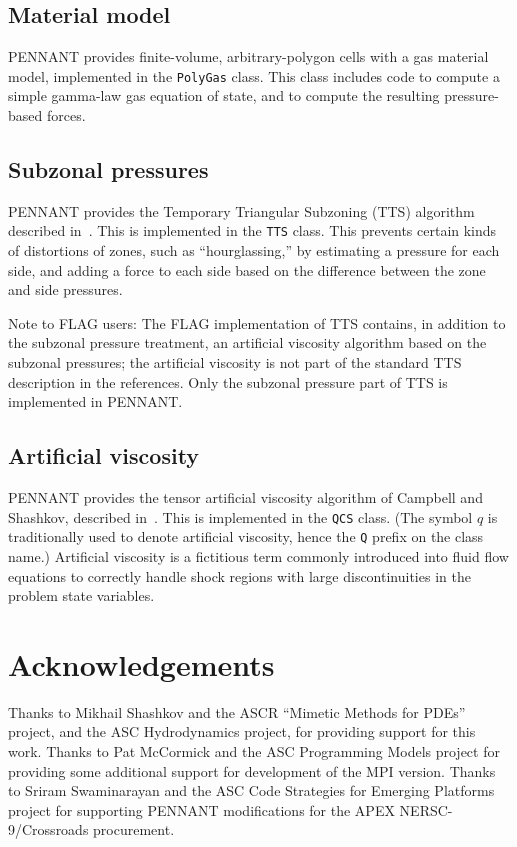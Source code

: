 \documentclass[11pt,letterpaper]{article}
\begin{document}
\subsection{Material model}

PENNANT provides finite-volume, arbitrary-polygon cells with a
gas material model, implemented in the {\tt PolyGas} class.
This class includes code to compute a simple gamma-law gas
equation of state, and to compute the resulting pressure-based
forces.

\subsection{Subzonal pressures}

PENNANT provides the Temporary Triangular Subzoning (TTS) algorithm
described in~\cite{szp,tts}.  This is implemented in the {\tt TTS}
class.  This prevents certain kinds of distortions of zones, such as
``hourglassing,'' by estimating a pressure for each side, and adding
a force to each side based on the difference
between the zone and side pressures.

Note to FLAG users:  The FLAG implementation of TTS contains, in addition
to the subzonal pressure treatment, an artificial viscosity algorithm
based on the subzonal pressures; the artificial viscosity is not part of
the standard TTS description in the references.  Only the subzonal pressure
part of TTS is implemented in PENNANT.

\subsection{Artificial viscosity}

PENNANT provides the tensor artificial viscosity algorithm of Campbell and
Shashkov, described in~\cite{qcs}.  This is implemented in the {\tt QCS}
class.  (The symbol $q$ is traditionally used to denote artificial
viscosity, hence the {\tt Q} prefix on the class name.)
Artificial viscosity is a fictitious term commonly introduced into
fluid flow equations to correctly handle
shock regions with large discontinuities in
the problem state variables.


\section*{Acknowledgements}

Thanks to Mikhail Shashkov and the ASCR ``Mimetic Methods for PDEs''
project, and the ASC Hydrodynamics project, for providing support for
this work.  Thanks to Pat McCormick and the ASC Programming Models
project for providing some additional support for development of the
MPI version.  Thanks to Sriram Swaminarayan and the ASC Code Strategies
for Emerging Platforms project for supporting PENNANT modifications
for the APEX NERSC-9/Crossroads procurement.
\end{document}
